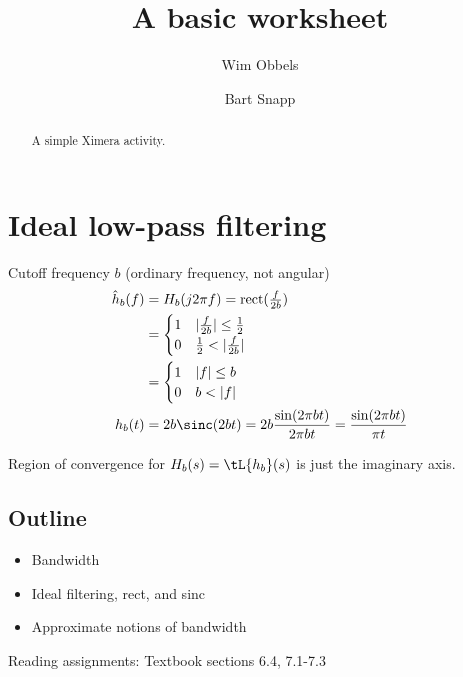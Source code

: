 \documentclass{ximera}
\title{A basic worksheet}
\author{Wim Obbels \and Bart Snapp}
\begin{document}
\begin{abstract}
    A simple Ximera activity.   
\end{abstract}
\maketitle
\label{xim:aFirstActivity}


\section{Ideal low-pass filtering}
  Cutoff frequency $b$ (ordinary frequency, not angular)
    \begin{align*}
      \hat{h}_b(f)
      &= H_b(j2\pi f) = \operatorname{rect}(\tfrac{f}{2b})\\
      &= \begin{cases}
      1 & |\tfrac{f}{2b}| \leq \tfrac{1}{2}\\
      0 & \tfrac{1}{2} < |\tfrac{f}{2b}|
    \end{cases}\\
      &= \begin{cases}
      1 & |f| \leq b\\
      0 & b < |f|
    \end{cases}\\
      h_b(t)
      &= 2 b \sinc(2 b t) = 2 b\frac{\sin(2 \pi b t)}{2 \pi b t} = \frac{\sin(2 \pi b t)}{\pi t}
    \end{align*}

    Region of convergence for $H_b(s) = \tL{h_b}(s)$ is just the imaginary axis.\\


\subsection{Outline}
  \begin{itemize}
  \item Bandwidth
  \item Ideal filtering, rect, and sinc
  \item Approximate notions of bandwidth
  \end{itemize}
  Reading assignments: Textbook sections 6.4, 7.1-7.3


\end{document}
